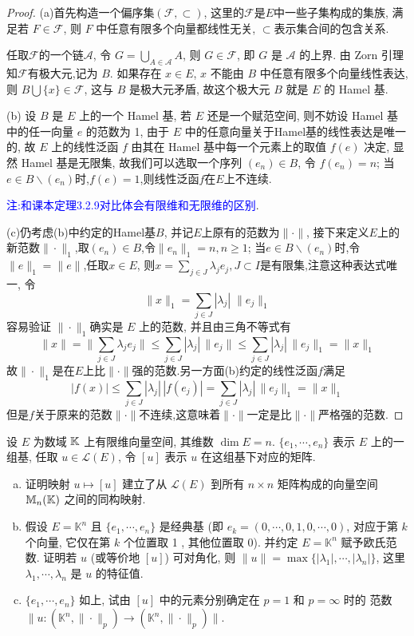 \begin{proof}
(a)首先构造一个偏序集$(\mathcal{F},\subset)$, 这里的$\mathcal{F}$是$E$中一些子集构成的集族,
满足若 $F\in\mathcal{F}$, 则 $F$ 中任意有限多个向量都线性无关, $\subset$表示集合间的包含关系.

任取$\mathcal{F}$的一个链$\mathcal{A}$,
令 $G=\bigcup_{A\in\mathcal{A}}A$, 则 $G\in\mathcal{F}$,
即 $G$ 是 $\mathcal{A}$ 的上界. 由 Zorn 引理知$\mathcal{F}$有极大元,记为 $B$.
如果存在 $x\in E$, $x$ 不能由 $B$ 中任意有限多个向量线性表达,
则 $B\bigcup\{x\}\in\mathcal{F}$, 这与 $B$ 是极大元矛盾, 故这个极大元 $B$ 就是 $E$ 的 Hamel 基.

(b) 设 $B$ 是 $E$ 上的一个 Hamel 基, 若 $E$ 还是一个赋范空间,
则不妨设 Hamel 基中的任一向量 $e$ 的范数为 1,
由于 $E$ 中的任意向量关于Hamel基的线性表达是唯一的,
故 $E$ 上的线性泛函 $f$ 由其在 Hamel 基中每一个元素上的取值 $f(e)$ 决定,
显然 Hamel 基是无限集, 故我们可以选取一个序列 $(e_n)\in B$,
令 $f(e_n)=n$; 当$e\in B\backslash(e_n)$时,$f(e)=1$,则线性泛函$f$在$E$上不连续.

\textcolor{blue}{注:和课本定理3.2.9对比体会有限维和无限维的区别}.

(c)仍考虑(b)中约定的Hamel基$B$, 并记$E$上原有的范数为$\|\cdot\|$,
接下来定义$E$上的新范数$\|\cdot\|_1$,取$(e_n)\in B$,令$\|e_n\|_1=n,n\geq 1$;
当$e\in B\backslash(e_n)$时,令$\|e\|_1=\|e\|$,任取$x\in E$,
则$x=\sum_{j\in J}\lambda_je_j,J\subset I$是有限集,注意这种表达式唯一,
令
\[\|x\|_1=\sum_{j\in J}|\lambda_j|\;\|e_j\|_1\]
容易验证 $\|\cdot\|_1$确实是 $E$ 上的范数, 并且由三角不等式有
\[\|x\|=\|\sum_{j\in J}\lambda_je_j\|\leq\sum_{j\in J}|\lambda_j|\,\|e_j\|\leq\sum_{j\in J}|\lambda_j|\,\|e_j\|_1=\|x\|_1\]
故$\|\cdot\|_1$是在$E$上比$\|\cdot\|$强的范数.另一方面(b)约定的线性泛函$f$满足
\[|f(x)|\leq\sum_{j\in J}|\lambda_j|\,|f(e_j)|=\sum_{j\in J}|\lambda_j|\,\|e_j\|_1=\|x\|_1\]
但是$f$关于原来的范数$\|\cdot\|$不连续,这意味着$\|\cdot\|$一定是比$\|\cdot\|$严格强的范数.
\end{proof}



\begin{exercise}
  设 $E$ 为数域 $\mathbb{K}$ 上有限维向量空间, 其维数 $\dim E=n$.
  $\{e_{1},\cdots,e_{n}\}$ 表示 $E$ 上的一组基, 任取 $u\in\mathcal{L}(E)$,
  令 $[u]$ 表示 $u$ 在这组基下对应的矩阵.
  \begin{enumerate}[(a)]
    \item 证明映射 $u \mapsto[u]$ 建立了从 $\mathcal{L}(E)$ 到所有 $n \times n$ 矩阵构成的向量空间 
      $\mathbb{M}_{n}(\mathbb{K})$ 之间的同构映射.
    \item 假设 $E=\mathbb{K}^{n}$ 且 $\{e_1,\cdots,e_n\}$ 是经典基 
      (即 $e_{k}=(0, \cdots, 0,1,0, \cdots, 0)$, 对应于第 $k$ 个向量, 
      它仅在第 $k$ 个位置取 1 , 其他位置取 $0$). 
      并约定 $E=\mathbb{K}^{n}$ 赋予欧氏范数. 证明若 $u$ (或等价地 $[u]$) 可对角化, 
      则 $\|u\|=\max\{|\lambda_{1}|,\cdots,|\lambda_{n}|\}$, 这里 $\lambda_{1}, \cdots, \lambda_{n}$ 是 $u$ 的特征值.
    \item $\{e_{1}, \cdots, e_{n}\}$ 如上, 试由 $[u]$ 中的元素分别确定在 $p=1$ 和 $p=\infty$ 时的
      范数 $\|u:(\mathbb{K}^{n},\|\cdot\|_{p})\rightarrow(\mathbb{K}^{n},\|\cdot\|_{p})\|$.
  \end{enumerate}
\end{exercise}

